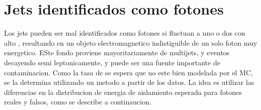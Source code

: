 

%

\section{Jets identificados como fotones} \label{sec:jetfakes}

Los jets pueden ser mal identificados como fotones si fluctuan a uno o dos
{\pizero} con alto \pt, resultando en un objeto electromagnetico indistiguible
de un solo foton muy energetico.
ESte fondo proviene mayoritariamente de multijets, {\wjets} y eventos {\ttbar} decayendo
semi leptonicamente, y puede ser una fuente importante de contaminacion.
Como la tasa de {\misid} se espera que no este bien modelada por el MC, se la determina
utilizando un metodo a partir de los datos. La idea es utilizar las diferencias en la
distribucion de energia de aislamiento esperada para fotones reales y falsos, como
se describe a continaucion.

